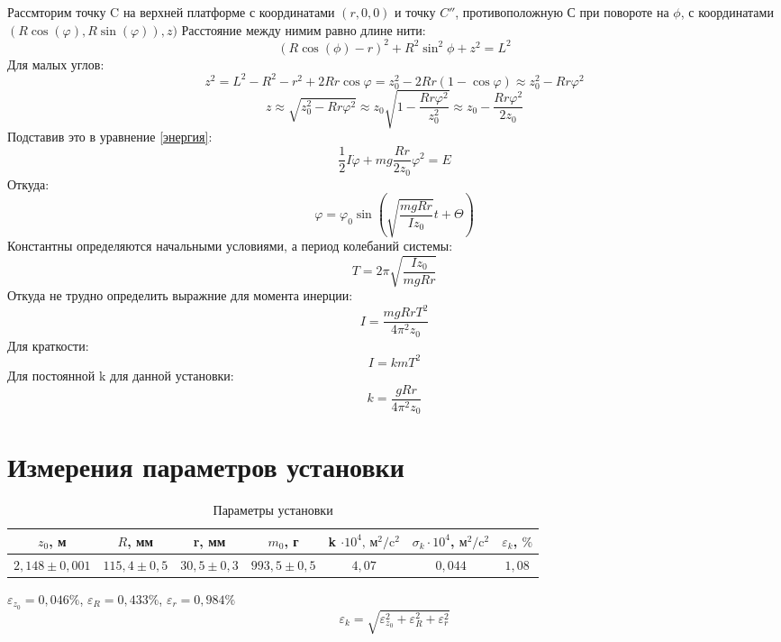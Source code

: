 \documentclass[a4paper, 12pt]{article}
\begin{document}
Рассмторим точку C на верхней платформе с координатами $(r, 0, 0)$ и точку $C''$, противоположную С при повороте на $\phi$, с координатами $(R\cos(\varphi), R\sin(\varphi)), z)$
Расстояние между нимим равно длине нити:
\begin{equation}
(R\cos(\phi)-r)^2+R^2\sin^2\phi+z^2=L^2
\end{equation}
Для малых углов:
\begin{equation}
z^2=L^2-R^2-r^2+2Rr\cos\varphi=z_0^2-2Rr(1-\cos\varphi)\approx z_0^2-Rr\varphi^2
\end{equation}
\begin{equation}
z \approx \sqrt{z_0^2-Rr\varphi^2}\approx z_0 \sqrt{1-\frac{Rr\varphi^2}{z_0^2}} \approx z_0- \frac{Rr\varphi^2}{2z_0}
\end{equation}
Подставив это в уравнение \ref{энергия}:
\begin{equation}
\frac{1}{2}I\dot{\varphi}+mg\frac{Rr}{2z_0}\varphi^2=E
\end{equation}
Откуда:
\begin{equation}
\varphi=\varphi_0\sin(\sqrt{\frac{mgRr}{Iz_0}}t+\Theta)
\end{equation}
Константны определяются начальными условиями, а период колебаний системы:
\begin{equation}
T=2\pi\sqrt{\frac{Iz_0}{mgRr}}
\end{equation}
Откуда не трудно определить выражние для момента инерции:
\begin{equation}
I=\frac{mgRrT^2}{4\pi^2z_0}
\end{equation}
Для краткости:
\begin{equation}
I=kmT^2
\end{equation}
Для постоянной k для данной установки:
\begin{equation}
k=\frac{gRr}{4\pi^2z_0}
\end{equation}

\section*{Измерения параметров установки}
\newpage
\begin{table}[ht]
\label{геом}
\caption{Параметры установки}
\centering
\begin{tabular}{|c|c|c|c|c|c|c|}
\hline $z_0$, м& $R$, мм & r, мм & $m_0$, г & k $ \cdot 10^{4} \text{, м}^2/\text{c}^2$ & $\sigma_k \cdot 10^{4}$, $\text{м}^2/\text{c}^2$ & $\varepsilon_k$, $\%$\\ 
\hline $2,148 \pm 0,001$ & $115,4 \pm 0,5$ & $30,5 \pm 0,3$ & $993,5 \pm 0,5$ & $4,07$ & $0,044$ & $1,08$ \\ 
\hline 
\end{tabular} 
\end{table}
$\varepsilon_{z_0} = 0,046\%$, $\varepsilon_R = 0,433\%$, $\varepsilon_r = 0,984\%$
\[ \varepsilon_k = \sqrt{\varepsilon_{z_0}^2+\varepsilon_R^2+\varepsilon_r^2}\]
\end{document}

